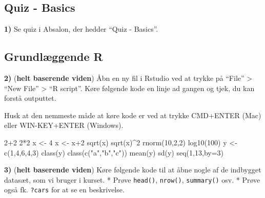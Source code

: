 \documentclass[
]{book}
\newenvironment{Shaded}{\begin{snugshade}}{\end{snugshade}}
\newcommand{\AttributeTok}[1]{\textcolor[rgb]{0.77,0.63,0.00}{#1}}
\newcommand{\DecValTok}[1]{\textcolor[rgb]{0.00,0.00,0.81}{#1}}
\newcommand{\FunctionTok}[1]{\textcolor[rgb]{0.00,0.00,0.00}{#1}}
\newcommand{\NormalTok}[1]{#1}
\newcommand{\OtherTok}[1]{\textcolor[rgb]{0.56,0.35,0.01}{#1}}
\newcommand{\SpecialCharTok}[1]{\textcolor[rgb]{0.00,0.00,0.00}{#1}}
\newcommand{\StringTok}[1]{\textcolor[rgb]{0.31,0.60,0.02}{#1}}
\begin{document}
\hypertarget{quiz---basics}{%
\subsection{Quiz - Basics}\label{quiz---basics}}

\textbf{1)} Se quiz i Absalon, der hedder ``Quiz - Basics''.

\hypertarget{grundluxe6ggende-r}{%
\subsection{Grundlæggende R}\label{grundluxe6ggende-r}}

\textbf{2)} (\textbf{helt baserende viden}) Åbn en ny fil i Rstudio ved at trykke på ``File'' \textgreater{} ``New File'' \textgreater{} ``R script''. Køre følgende kode en linje ad gangen og tjek, du kan forstå outputtet.

Husk at den nemmeste måde at køre kode er ved at trykke CMD+ENTER (Mac) eller WIN-KEY+ENTER (Windows).

\begin{Shaded}
\begin{Highlighting}[]
\DecValTok{2}\SpecialCharTok{+}\DecValTok{2}
\DecValTok{2}\SpecialCharTok{*}\DecValTok{2}
\NormalTok{x }\OtherTok{\textless{}{-}} \DecValTok{4}
\NormalTok{x }\OtherTok{\textless{}{-}}\NormalTok{ x}\SpecialCharTok{+}\DecValTok{2}
\FunctionTok{sqrt}\NormalTok{(x)}
\FunctionTok{sqrt}\NormalTok{(x)}\SpecialCharTok{\^{}}\DecValTok{2}
\FunctionTok{rnorm}\NormalTok{(}\DecValTok{10}\NormalTok{,}\DecValTok{2}\NormalTok{,}\DecValTok{2}\NormalTok{)}
\FunctionTok{log10}\NormalTok{(}\DecValTok{100}\NormalTok{)}
\NormalTok{y }\OtherTok{\textless{}{-}}  \FunctionTok{c}\NormalTok{(}\DecValTok{1}\NormalTok{,}\DecValTok{4}\NormalTok{,}\DecValTok{6}\NormalTok{,}\DecValTok{4}\NormalTok{,}\DecValTok{3}\NormalTok{)}
\FunctionTok{class}\NormalTok{(y)}
\FunctionTok{class}\NormalTok{(}\FunctionTok{c}\NormalTok{(}\StringTok{"a"}\NormalTok{,}\StringTok{"b"}\NormalTok{,}\StringTok{"c"}\NormalTok{))}
\FunctionTok{mean}\NormalTok{(y)}
\FunctionTok{sd}\NormalTok{(y)}
\FunctionTok{seq}\NormalTok{(}\DecValTok{1}\NormalTok{,}\DecValTok{13}\NormalTok{,}\AttributeTok{by=}\DecValTok{3}\NormalTok{)}
\end{Highlighting}
\end{Shaded}

\textbf{3)} (\textbf{helt baserende viden}) Køre følgende kode til at åbne nogle af de indbygget datasæt, som vi bruger i kurset.
* Prøve \texttt{head()}, \texttt{nrow()}, \texttt{summary()} osv.
* Prøve også fk. \texttt{?cars} for at se en beskrivelse.
\end{document}
